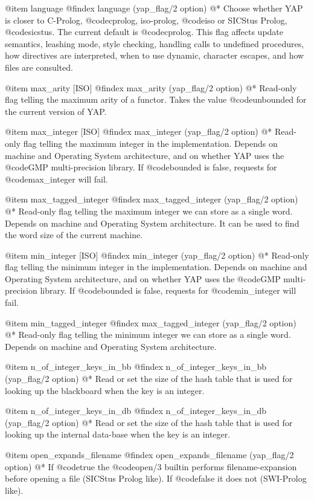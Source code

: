 {{{{{{{{{@item language
@findex language (yap_flag/2 option)
@* 
Choose whether YAP is closer to C-Prolog, @code{cprolog}, iso-prolog,
@code{iso} or SICStus Prolog, @code{sicstus}. The current default is
@code{cprolog}. This flag affects update semantics, leashing mode,
style checking, handling calls to undefined procedures, how directives
are interpreted, when to use dynamic, character escapes, and how files
are consulted.

@item max_arity [ISO]
@findex max_arity (yap_flag/2 option)
@*
Read-only flag telling the maximum arity of a functor. Takes the value
@code{unbounded} for the current version of YAP.

@item max_integer [ISO]
@findex max_integer (yap_flag/2 option)
@*
Read-only flag telling the maximum integer in the
implementation. Depends on machine and Operating System
architecture, and on whether YAP uses the @code{GMP} multi-precision
library. If @code{bounded} is false, requests for @code{max_integer}
will fail.

@item max_tagged_integer 
@findex max_tagged_integer (yap_flag/2 option)
@*
Read-only flag telling the maximum integer we can store as a single
word. Depends on machine and Operating System
architecture. It can be used to find the word size of the current machine.

@item min_integer [ISO]
@findex min_integer (yap_flag/2 option)
@* Read-only flag telling the minimum integer in the
implementation. Depends on machine and Operating System architecture,
and on whether YAP uses the @code{GMP} multi-precision library. If
@code{bounded} is false, requests for @code{min_integer} will fail.

@item min_tagged_integer 
@findex max_tagged_integer (yap_flag/2 option)
@*
Read-only flag telling the minimum integer we can store as a single
word. Depends on machine and Operating System
architecture.

@item n_of_integer_keys_in_bb
@findex n_of_integer_keys_in_bb (yap_flag/2 option)
@*
Read or set the size of the hash table that is used for looking up the
blackboard when the key is an integer.

@item n_of_integer_keys_in_db
@findex n_of_integer_keys_in_db (yap_flag/2 option)
@*
Read or set the size of the hash table that is used for looking up the
internal data-base when the key is an integer.

@item open_expands_filename
@findex open_expands_filename (yap_flag/2 option)
@*
If @code{true} the @code{open/3} builtin performs filename-expansion
before opening a file (SICStus Prolog like). If @code{false} it does not
(SWI-Prolog like).

}}}}}}}}}
